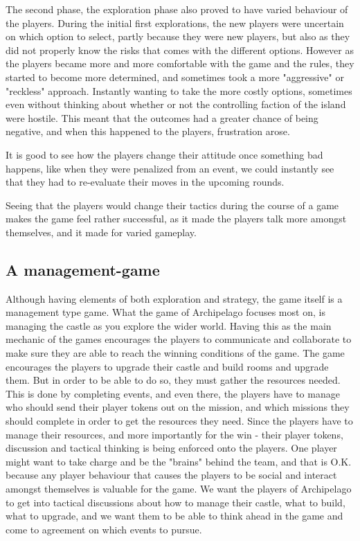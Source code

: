 The second phase, the exploration phase also proved to have varied behaviour of the players. During the initial first explorations, the new players were uncertain on which option to select, partly because they were new players, but also as they did not properly know the risks that comes with the different options. However as the players became more and more comfortable with the game and the rules, they started to become more determined, and sometimes took a more "aggressive" or "reckless" approach. Instantly wanting to take the more costly options, sometimes even without thinking about whether or not the controlling faction of the island were hostile. This meant that the outcomes had a greater chance of being negative, and when this happened to the players, frustration arose. 

It is good to see how the players change their attitude once something bad happens, like when they were penalized from an event, we could instantly see that they had to re-evaluate their moves in the upcoming rounds. 

Seeing that the players would change their tactics during the course of a game makes the game feel rather successful, as it made the players talk more amongst themselves, and it made for varied gameplay.

\subsection{A management-game}
\label{sec:management}
Although having elements of both exploration and strategy, the game itself is a management type game. What the game of Archipelago focuses most on, is managing the castle as you explore the wider world. Having this as the main mechanic of the games encourages the players to communicate and collaborate to make sure they are able to reach the winning conditions of the game. The game encourages the players to upgrade their castle and build rooms and upgrade them. But in order to be able to do so, they must gather the resources needed. This is done by completing events, and even there, the players have to manage who should send their player tokens out on the mission, and which missions they should complete in order to get the resources they need. Since the players have to manage their resources, and more importantly for the win - their player tokens, discussion and tactical thinking is being enforced onto the players. One player might want to take charge and be the "brains" behind the team, and that is O.K. because any player behaviour that causes the players to be social and interact amongst themselves is valuable for the game. We want the players of Archipelago to get into tactical discussions about how to manage their castle, what to build, what to upgrade, and we want them to be able to think ahead in the game and come to agreement on which events to pursue. 



